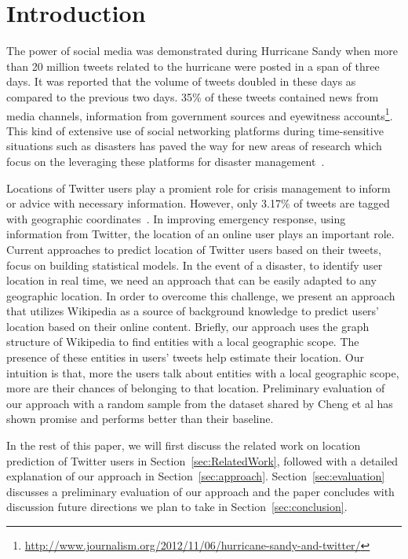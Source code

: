 \section{Introduction}
\label{sec:Introduction}

The power of social media was demonstrated during Hurricane Sandy when more than 20 million tweets related to the hurricane were posted in a span of three days. It was reported that the volume of tweets doubled in these days as compared to the previous two days. 35\% of these tweets contained news from media channels, information from government sources and eyewitness accounts\footnote{\url{http://www.journalism.org/2012/11/06/hurricane-sandy-and-twitter/}}. This kind of extensive use of social networking platforms during time-sensitive situations such as disasters has paved the way for new areas of research which focus on the leveraging these platforms for disaster management~\cite{purohit2013emergency}. 

Locations of Twitter users play a promient role for crisis management to inform or advice with necessary information. However, only  3.17\% of tweets are tagged with geographic coordinates~\cite{morstatter2013sample}. In improving emergency response, using information from Twitter, the location of an online user plays an important role. 
Current approaches to predict location of Twitter users based on their tweets, focus on building statistical models.
In the event of a disaster, to identify user location in real time, we need an approach that can be easily adapted to any geographic location. In order to overcome this challenge, we present an approach that utilizes Wikipedia as a source of background knowledge to predict users' location based on their online content. Briefly, our approach uses the graph structure of Wikipedia to find entities with a local geographic scope. The presence of these entities in users' tweets help estimate their location. Our intuition is that, more the users talk about entities with a local geographic scope, more are their chances of belonging to that location. Preliminary evaluation of our approach with a random sample from the dataset shared by Cheng et al\cite{cheng2010you} has shown promise and performs better than their baseline.   

In the rest of this paper, we will first discuss the related work on location prediction of Twitter users in Section~\ref{sec:RelatedWork}, followed with a detailed explanation of our approach in Section~\ref{sec:approach}. Section~\ref{sec:evaluation} discusses a preliminary evaluation of our approach and the paper concludes with discussion future directions we plan to take in Section~\ref{sec:conclusion}. 